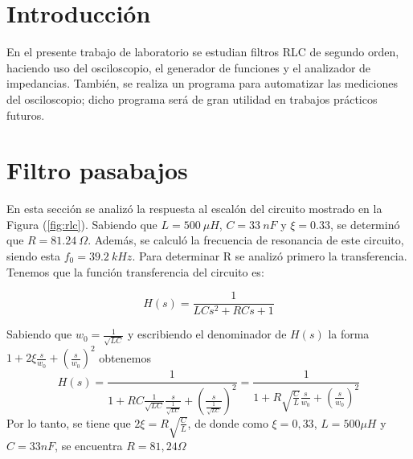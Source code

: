 







\tableofcontents
\newpage


\section{Introducción}
En el presente trabajo de laboratorio se estudian filtros RLC de segundo orden, haciendo uso del osciloscopio, el generador de funciones y el analizador de impedancias. También, se realiza un programa para automatizar las mediciones del osciloscopio; dicho programa será de gran utilidad en trabajos prácticos futuros.



\section{Filtro pasabajos}

En esta sección se analizó la respuesta al escalón del circuito mostrado en la Figura (\ref{fig:rlc}). Sabiendo que $L = 500 \ \mu H$, $C = 33 \ nF$ y $\xi = 0.33$, se determinó que $R = 81.24 \ \Omega$. Además, se calculó la frecuencia de resonancia de este circuito, siendo esta $f_0 = 39.2 \ kHz$. Para determinar R se analizó primero la transferencia. Tenemos que la función transferencia del circuito es:

\begin{equation}
	H(s) = \frac{1}{LC s^2 + RC s + 1}
	\label{equ:hrlc}
\end{equation}

Sabiendo que $w_0=\frac{1}{\sqrt{LC}}$ y escribiendo el denominador de $H(s)$ la forma $1+2\xi\frac{s}{w_0}+(\frac{s}{w_0})^2$ obtenemos \begin{equation}
    H(s)=\frac{1}{1+RC\frac{1}{\sqrt{LC}}\frac{s}{\frac{1}{\sqrt{LC}}}+(\frac{s}{\frac{1}{\sqrt{LC}}})^2}=\frac{1}{1+R\sqrt{\frac{C}{L}}\frac{s}{w_0}+(\frac{s}{w_0})^2}
\end{equation}
Por lo tanto, se tiene que $2\xi=R\sqrt{\frac{C}{L}}$, de donde como $\xi=0,33$, $L=500\mu H$ y $C=33nF$, se encuentra $R=81,24\Omega$


